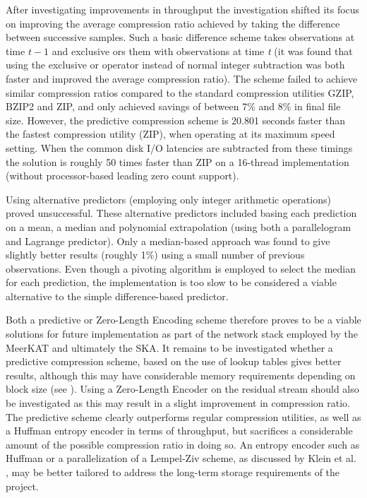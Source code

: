 After investigating improvements in throughput the investigation shifted its focus on improving the average compression ratio achieved by taking the difference between successive samples. Such a basic difference
scheme takes observations at time $t-1$ and exclusive ors them with observations at time \textit{t} (it was found that using the exclusive or operator instead of normal integer subtraction was both faster and improved the average
compression ratio). The scheme failed to achieve similar compression ratios compared to the standard compression utilities GZIP, BZIP2 and ZIP, and only achieved savings of between 7\% and 8\% in final file size.
However, the predictive compression scheme is 20.801 seconds faster than the fastest compression utility (ZIP), when operating at its maximum speed setting. When the common disk I/O latencies are subtracted from these 
timings the solution is roughly 50 times faster than ZIP on a 16-thread implementation (without processor-based leading zero count support).

Using alternative predictors (employing only integer arithmetic operations) proved unsuccessful. These alternative predictors included basing each prediction on a mean, a median and polynomial extrapolation (using both a 
parallelogram and Lagrange predictor). Only a median-based approach was found to give slightly better results (roughly 1\%) using a small number of previous observations. Even though a pivoting algorithm is employed to 
select the median for each prediction, the implementation is too slow to be considered a viable alternative to the simple difference-based predictor.

Both a predictive or Zero-Length Encoding scheme therefore proves to be a viable solutions for future implementation as part of the network stack employed by the MeerKAT and ultimately the SKA. It remains to be investigated whether a predictive 
compression scheme, based on the use of lookup tables gives better results, although this may have considerable memory requirements depending on block size (see \cite{1607248,4589203,4976448}). Using a Zero-Length Encoder on the residual
stream should also be investigated as this may result in a slight improvement in compression ratio. The predictive scheme clearly outperforms regular compression utilities, as well as a Huffman entropy encoder in terms of throughput, 
but sacrifices a considerable amount of the possible compression ratio in doing so. An entropy encoder such as Huffman or a parallelization of a Lempel-Ziv scheme, as discussed by Klein et al. \cite{klein2005parallel}, may be better tailored 
to address the long-term storage requirements of the project.


